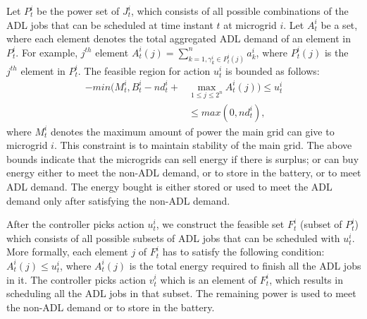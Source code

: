 Let $P_{t}^{i}$ be the power set of $J_{t}^{i}$, which consists of all possible combinations of the ADL jobs that can be scheduled at time instant $t$ at microgrid $i$. Let  $A_{t}^{i}$ be a set, where each element denotes the total aggregated ADL demand of an element in $P_{t}^{i}$. For example, $j^{th}$ element $A_{t}^{i}(j) = \sum_{k=1, \gamma_k^i \in P_{t}^{i}(j) }^n a_k^i$, where $ P_{t}^{i}(j)$ is the $j^{th}$ element in  $P_{t}^{i}$.
 The feasible region for action $u_{t}^{i}$ is bounded as follows:
\begin{align}
-min(M_t^i, B_t^i - nd_t^i + &\max_{1\leq j \leq 2^n} A_t^i(j) ) \leq u_t^i \nonumber\\ &\leq max(0, nd_t^i),
\end{align}
where $M_t^i$ denotes the maximum amount of power the main grid can give to microgrid $i$. This constraint is to maintain stability of the main grid. The above bounds indicate that the  microgrids can sell energy if there is surplus; or can buy energy either to meet the non-ADL demand, or to store in the battery, or to meet ADL demand. The energy bought is either stored or used to meet the ADL demand only after satisfying the non-ADL demand. 

After the controller picks action $u_{t}^{i}$, we construct the feasible set $F_{t}^{i}$ (subset of $P_{t}^{i}$) which  consists of all possible subsets of ADL jobs that can be scheduled with $u_{t}^{i}$. More formally, each element $j$ of  $F_{t}^{i}$ has to satisfy the following condition:   $A_t^i(j) \leq u_{t}^{i} $, where $A_t^i(j)$ is the total energy required to finish all the ADL jobs in it. The controller picks action $v_{t}^{i}$ which is an element of $F_{t}^{i}$, which results in scheduling all the ADL jobs in that subset. The remaining power is used to meet the non-ADL demand or to store in the battery.

